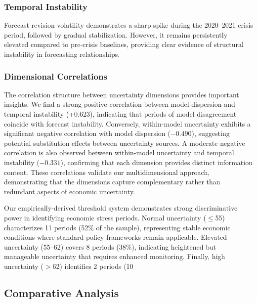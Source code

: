 \documentclass[12pt,a4paper]{article}
\theoremstyle{remark}
\begin{document}
\subsubsection{Temporal Instability}
Forecast revision volatility demonstrates a sharp spike during the 2020--2021 crisis period, followed by gradual stabilization. However, it remains persistently elevated compared to pre-crisis baselines, providing clear evidence of structural instability in forecasting relationships.

\subsubsection{Dimensional Correlations}
The correlation structure between uncertainty dimensions provides important insights. We find a strong positive correlation between model dispersion and temporal instability (+0.623), indicating that periods of model disagreement coincide with forecast instability. Conversely, within-model uncertainty exhibits a significant negative correlation with model dispersion ($-0.490$), suggesting potential substitution effects between uncertainty sources. A moderate negative correlation is also observed between within-model uncertainty and temporal instability ($-0.331$), confirming that each dimension provides distinct information content. These correlations validate our multidimensional approach, demonstrating that the dimensions capture complementary rather than redundant aspects of economic uncertainty.

Our empirically-derived threshold system demonstrates strong discriminative power in identifying economic stress periods. Normal uncertainty ($\leq$55) characterizes 11 periods (52\% of the sample), representing stable economic conditions where standard policy frameworks remain applicable. Elevated uncertainty (55--62) covers 8 periods (38\%), indicating heightened but manageable uncertainty that requires enhanced monitoring. Finally, high uncertainty ($>$62) identifies 2 periods (10%

\subsection{Comparative Analysis}
\end{document}

